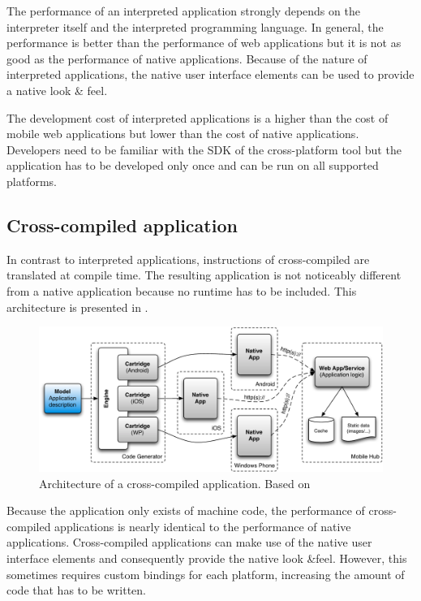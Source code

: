 The performance of an interpreted application strongly depends on the interpreter itself and the interpreted programming language. In general, the performance is better than the performance of web applications but it is not as good as the performance of native applications. Because of the nature of interpreted applications, the native user interface elements can be used to provide a native look \& feel.

The development cost of interpreted applications is a higher than the cost of mobile web applications but lower than the cost of native applications. Developers need to be familiar with the SDK of the cross-platform tool but the application has to be developed only once and can be run on all supported platforms.

\subsection{Cross-compiled application}

In contrast to interpreted applications, instructions of cross-compiled are translated at compile time. The resulting application is not noticeably different from a native application because no runtime has to be included. This architecture is presented in . 

\begin{figure}[h]
    \begin{center}
        \includegraphics[width=\textwidth]{figs/crosscompiled.pdf}
        \caption{Architecture of a cross-compiled application. Based on \cite{Friese}}
        \label{fig:crosscompiled}
    \end{center}
\end{figure} 

Because the application only exists of machine code, the performance of cross-compiled applications is nearly identical to the performance of native applications. Cross-compiled applications can make use of the native user interface elements and consequently provide the native look \&feel. However, this sometimes requires custom bindings for each platform, increasing the amount of code that has to be written. 

